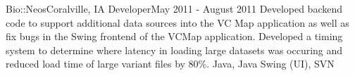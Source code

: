 \resumePosition
    {Bio::Neos}{Coralville, IA}
    {Developer}{May 2011 - August 2011}
\resumeItemListStart
{}
    {Developed backend code to support additional data sources into the VC Map application as well as fix bugs in the Swing frontend of the VCMap application.  Developed a timing system to determine where latency in loading large datasets was occuring and reduced load time of large variant files by 80\%.}
    {Java, Java Swing (UI), SVN}
\resumeItemListEnd
